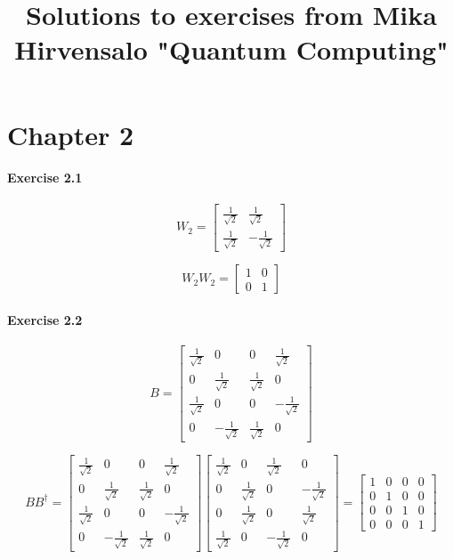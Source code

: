 \documentclass[a4paper]{article}
\title{Solutions to exercises from Mika Hirvensalo "Quantum Computing"}
\date{}
\begin{document}
\maketitle
\tableofcontents

\section{Chapter 2}

\paragraph{Exercise 2.1}

$$
W_{2} =
    \begin{bmatrix}
        \frac{1}{\sqrt{2}} & \frac{1}{\sqrt{2}} \\
        \frac{1}{\sqrt{2}} & -\frac{1}{\sqrt{2}}
    \end{bmatrix}
$$

$$
W_{2} W_{2} =
    \begin{bmatrix}
        1 & 0 \\
        0 & 1
    \end{bmatrix}
$$

\paragraph{Exercise 2.2}

$$
B =
    \begin{bmatrix}
        \frac{1}{\sqrt{2}} & 0 & 0 & \frac{1}{\sqrt{2}} \\
        0 & \frac{1}{\sqrt{2}} & \frac{1}{\sqrt{2}} & 0 \\
        \frac{1}{\sqrt{2}} & 0 & 0 & -\frac{1}{\sqrt{2}} \\
        0 & -\frac{1}{\sqrt{2}} & \frac{1}{\sqrt{2}} & 0
    \end{bmatrix}
$$

$$
B B^{\dag} =
    \begin{bmatrix}
        \frac{1}{\sqrt{2}} & 0 & 0 & \frac{1}{\sqrt{2}} \\
        0 & \frac{1}{\sqrt{2}} & \frac{1}{\sqrt{2}} & 0 \\
        \frac{1}{\sqrt{2}} & 0 & 0 & -\frac{1}{\sqrt{2}} \\
        0 & -\frac{1}{\sqrt{2}} & \frac{1}{\sqrt{2}} & 0
    \end{bmatrix}
    \begin{bmatrix}
        \frac{1}{\sqrt{2}} & 0 & \frac{1}{\sqrt{2}} & 0 \\
        0 & \frac{1}{\sqrt{2}} & 0 & -\frac{1}{\sqrt{2}} \\
        0 & \frac{1}{\sqrt{2}} & 0 & \frac{1}{\sqrt{2}} \\
        \frac{1}{\sqrt{2}} & 0 & -\frac{1}{\sqrt{2}} & 0
    \end{bmatrix}
    =
    \begin{bmatrix}
        1 & 0 & 0 & 0 \\
        0 & 1 & 0 & 0 \\
        0 & 0 & 1 & 0 \\
        0 & 0 & 0 & 1
    \end{bmatrix}
$$
\end{document}
